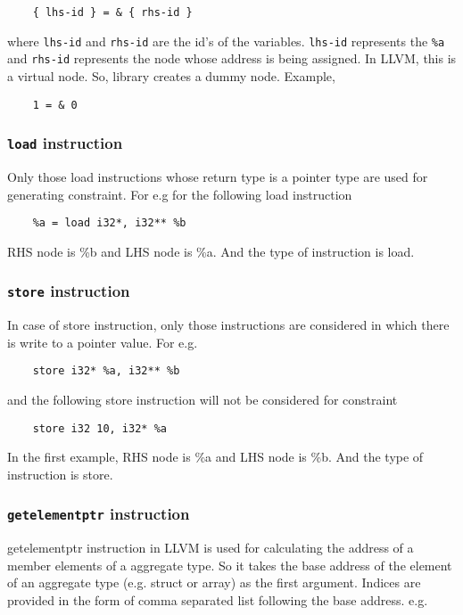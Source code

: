 \documentclass[a4paper,11pt]{report}
\begin{document}
\begin{lstlisting}
    { lhs-id } = & { rhs-id }
\end{lstlisting}
\noindent
where \texttt{lhs-id} and \texttt{rhs-id} are the id's of the variables. 
\texttt{lhs-id} represents the \texttt{\%a} and \texttt{rhs-id} represents the 
node whose address is being assigned. In LLVM, this is a virtual node. So, 
library creates a dummy node.
Example,

\begin{lstlisting}
    1 = & 0
\end{lstlisting}


\subsubsection{\texttt{load} instruction}
Only those load instructions whose return type is a pointer type are used for
generating constraint. For e.g for the following load instruction

\begin{lstlisting}
    %a = load i32*, i32** %b
\end{lstlisting}

\noindent
RHS node is \%b and LHS node is \%a. And the type of instruction is load.

\subsubsection{\texttt{store} instruction}
In case of store instruction, only those instructions are considered in which
there is write to a pointer value. For e.g.

\begin{lstlisting}
    store i32* %a, i32** %b
\end{lstlisting}
\noindent
and the following store instruction will not be considered for constraint

\begin{lstlisting}
    store i32 10, i32* %a
\end{lstlisting}

In the first example, RHS node is \%a and LHS node is \%b. And the type of 
instruction is store.

\subsubsection{\texttt{getelementptr} instruction}
getelementptr instruction in LLVM is used for calculating the address 
of a member elements of a aggregate type. So it takes the base address of
the element of an aggregate type (e.g. struct or array) as the first argument.
Indices are provided in the form of comma separated list following the base 
address.
e.g.
\end{document}
